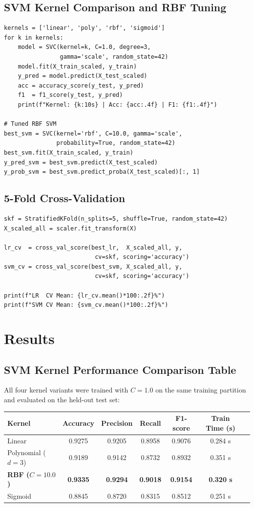 \documentclass[12pt,a4paper]{article}
\begin{document}
\subsection*{SVM Kernel Comparison and RBF Tuning}
\begin{lstlisting}
kernels = ['linear', 'poly', 'rbf', 'sigmoid']
for k in kernels:
    model = SVC(kernel=k, C=1.0, degree=3,
                gamma='scale', random_state=42)
    model.fit(X_train_scaled, y_train)
    y_pred = model.predict(X_test_scaled)
    acc = accuracy_score(y_test, y_pred)
    f1  = f1_score(y_test, y_pred)
    print(f"Kernel: {k:10s} | Acc: {acc:.4f} | F1: {f1:.4f}")

# Tuned RBF SVM
best_svm = SVC(kernel='rbf', C=10.0, gamma='scale',
               probability=True, random_state=42)
best_svm.fit(X_train_scaled, y_train)
y_pred_svm = best_svm.predict(X_test_scaled)
y_prob_svm = best_svm.predict_proba(X_test_scaled)[:, 1]
\end{lstlisting}

\subsection*{5-Fold Cross-Validation}
\begin{lstlisting}
skf = StratifiedKFold(n_splits=5, shuffle=True, random_state=42)
X_scaled_all = scaler.fit_transform(X)

lr_cv  = cross_val_score(best_lr,  X_scaled_all, y,
                          cv=skf, scoring='accuracy')
svm_cv = cross_val_score(best_svm, X_scaled_all, y,
                          cv=skf, scoring='accuracy')

print(f"LR  CV Mean: {lr_cv.mean()*100:.2f}%")
print(f"SVM CV Mean: {svm_cv.mean()*100:.2f}%")
\end{lstlisting}

\section{Results}

\subsection*{SVM Kernel Performance Comparison Table}
All four kernel variants were trained with $C=1.0$ on the same training partition and evaluated on the held-out test set:

\begin{tabular}{lcccccc}
\toprule
\textbf{Kernel} & \textbf{Accuracy} & \textbf{Precision} & \textbf{Recall} & \textbf{F1-score} & \textbf{Train Time (s)} \\
\midrule
Linear & 0.9275 & 0.9205 & 0.8958 & 0.9076 & 0.284 s \\
Polynomial ($d=3$) & 0.9189 & 0.9142 & 0.8732 & 0.8932 & 0.351 s \\
\textbf{RBF ($C=10.0$)} & \textbf{0.9335} & \textbf{0.9294} & \textbf{0.9018} & \textbf{0.9154} & \textbf{0.320 s} \\
Sigmoid & 0.8845 & 0.8720 & 0.8315 & 0.8512 & 0.251 s \\
\bottomrule
\end{tabular}
\end{document}
